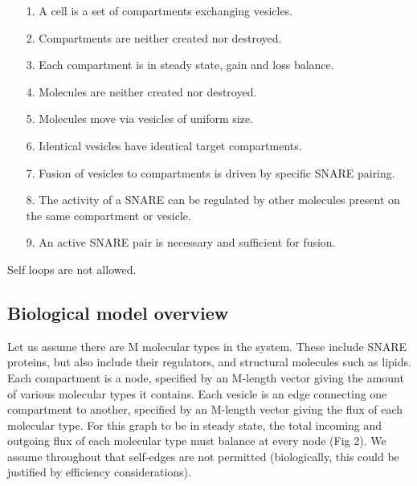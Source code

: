 \documentclass{llncs}
\begin{document}
\begin{enumerate}
\item[1.] A cell is a set of compartments exchanging vesicles.
\item[2.] Compartments are neither created nor destroyed.
\item[3.] Each compartment is in steady state, gain and loss balance.
\item[4.] Molecules are neither created nor destroyed. 
\item[5.] Molecules move via vesicles of uniform size.
\item[6.] Identical vesicles have identical target compartments.
\item[7.] Fusion of vesicles to compartments is driven by specific SNARE pairing.
\item[8.] The activity of a SNARE can be regulated by other molecules present on the same compartment or vesicle.
\item[9.] An active SNARE pair is necessary and sufficient for fusion.
\end{enumerate}

Self loops are not allowed. 

\subsection{Biological model overview}
Let us assume there are M molecular types in the system. These include SNARE proteins, but also include their regulators, and structural molecules such as lipids. Each compartment is a node, specified by an M-length vector giving the amount of various molecular types it contains. Each vesicle is an edge connecting one compartment to another, specified by an M-length vector giving the flux of each molecular type. For this graph to be in steady state, the total incoming and outgoing flux of each molecular type must balance at every node (Fig 2). We assume throughout that self-edges are not permitted (biologically, this could be justified by efficiency considerations).
\end{document}
